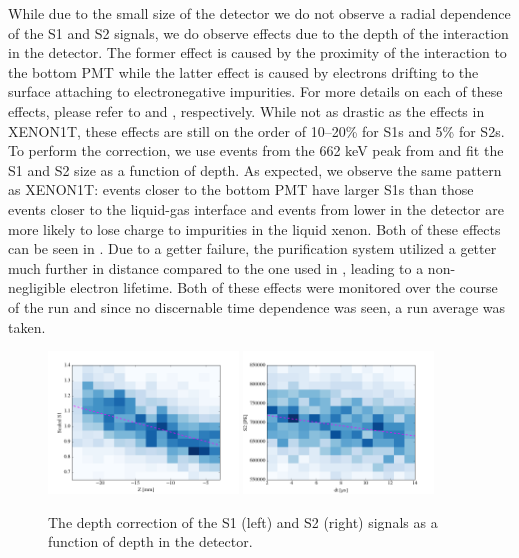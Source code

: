 While due to the small size of the detector we do not observe a radial dependence of the S1 and S2 signals, we do observe effects due to the depth of the interaction in the detector.  The former effect is caused by the proximity of the interaction to the bottom PMT while the latter effect is caused by electrons drifting to the surface attaching to electronegative impurities.  For more details on each of these effects, please refer to  and , respectively.  While not as drastic as the effects in XENON1T, these effects are still on the order of 10--20\% for S1s and 5\% for S2s.  To perform the correction, we use events from the 662 keV peak from \cesium{} and fit the S1 and S2 size as a function of depth.  As expected, we observe the same pattern as XENON1T: events closer to the bottom PMT have larger S1s than those events closer to the liquid-gas interface and events from lower in the detector are more likely to lose charge to impurities in the liquid xenon.  Both of these effects can be seen in .  Due to a getter failure, the purification system utilized a getter much further in distance compared to the one used in , leading to a non-negligible electron lifetime.  Both of these effects were monitored over the course of the run and since no discernable time dependence was seen, a run average was taken.


\begin{figure}[t]
        \centering
	\includegraphics[width=0.45\textwidth]{nerix_s1_z_correction}
	\includegraphics[width=0.45\textwidth]{nerix_s2_dt_correction}
	\caption{The depth correction of the S1 (left) and S2 (right) signals as a function of depth in the detector.}
	\label{fig:nerix_pos_correction}
\end{figure}




